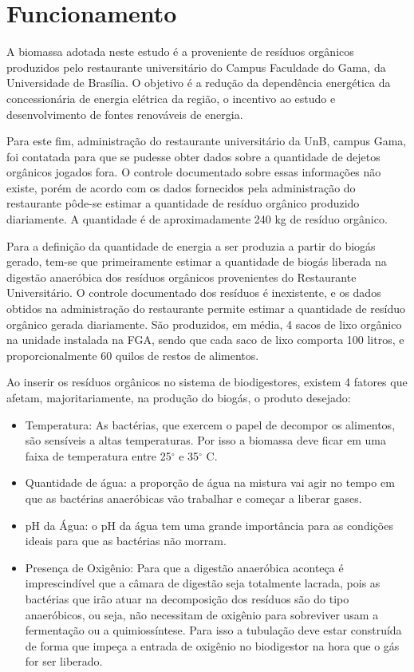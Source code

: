 \section {Funcionamento}
A biomassa adotada neste estudo é a proveniente de resíduos orgânicos produzidos pelo restaurante universitário do Campus Faculdade do Gama, da Universidade de Brasília. O objetivo é a redução da dependência energética da concessionária de energia elétrica da região, o incentivo ao estudo e desenvolvimento de fontes renováveis de energia.

Para este fim, administração do restaurante universitário da UnB, campus Gama, foi contatada para que se pudesse obter dados sobre a quantidade de dejetos orgânicos jogados fora. O controle documentado sobre essas informações não existe, porém de acordo com os dados fornecidos pela administração do restaurante pôde-se estimar a quantidade de resíduo orgânico produzido diariamente. A quantidade é de aproximadamente 240 kg de resíduo orgânico.

Para a definição da quantidade de energia a ser produzia a partir do biogás gerado, tem-se que primeiramente estimar a quantidade de biogás liberada na digestão anaeróbica dos resíduos orgânicos provenientes do Restaurante Universitário. O controle documentado dos resíduos é inexistente, e os dados obtidos na administração do restaurante permite estimar a quantidade de resíduo orgânico gerada diariamente.  São produzidos, em média, 4 sacos de lixo orgânico na unidade instalada na FGA, sendo que cada saco de lixo comporta 100 litros, e proporcionalmente 60 quilos de restos de alimentos.                        

Ao inserir os resíduos orgânicos no sistema de biodigestores, existem 4 fatores que afetam, majoritariamente, na produção do biogás, o produto desejado:

\begin{itemize}
        \item Temperatura: As bactérias, que exercem o papel de decompor os alimentos, são sensíveis a altas temperaturas. Por isso a biomassa deve ficar em uma faixa de temperatura entre 25$^{\circ}$ e 35$^{\circ}$ C.
        \item Quantidade de água: a proporção de água na mistura vai agir no tempo em que as bactérias anaeróbicas vão trabalhar e começar a liberar gases.
        \item pH da Água: o pH da água tem uma grande importância para as condições ideais para que as bactérias não morram.
        \item Presença de Oxigênio: Para que a digestão anaeróbica aconteça é imprescindível que a câmara de digestão seja totalmente lacrada, pois as bactérias que irão atuar na decomposição dos resíduos são do tipo anaeróbicos, ou seja, não necessitam de oxigênio para sobreviver usam a fermentação ou a quimiossíntese. Para isso a tubulação deve estar construída de forma que impeça a entrada de oxigênio no biodigestor na hora que o gás for ser liberado.
\end{itemize}

